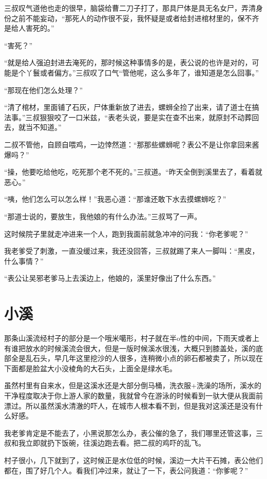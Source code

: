 三叔叹气道他也走的很早，脑袋给曹二刀子打了，那具尸体是具无名女尸，弄清身份之前不能妄动，“那死人的动作很不妥，我怀疑是或者给封进棺材里的，保不齐是给人害死的。”

“害死？”

“就是给人强迫封进去淹死的，那时候这种事情多的是，表公说的也许是对的，可能是个丫鬟或者偏方。”三叔叹了口气“管他呢，这么多年了，谁知道是怎么回事。”

“那现在他们怎么处理？”

“清了棺材，里面铺了石灰，尸体重新放了进去，螺蛳全捡了出来，请了道士在搞法事。”三叔狠狠咬了一口米兹，“表老头说，要是实在查不出来，就原封不动葬回去，就当不知道。”

二叔不管他，自顾自喂鸡，一边悻然道：“那那些螺蛳呢？表公不是让你拿回来酱爆吗？”

“操，他要吃给他吃，吃死那个老不死的。”三叔道。“昨天全倒到溪里去了，看着就恶心。”

“咦，他们怎么可以怎么样！”我恶心道：“那谁还敢下水去摸螺蛳吃？”

“那道士说的，要放生，我他娘的有什么办法。”三叔骂了一声。

这时候院子里就走冲进来一个人，跑到我面前就急冲冲的问我：“你老爹呢？”

我老爹受了刺激，一直没缓过来，我还没回答，三叔就踢了来人一脚叫：“黑皮，什么事情？”

“表公让吴邪老爹马上去溪边上，他娘的，溪里好像出了什么东西。”

\chapter{小溪}

那条山溪流经村子的部分是一个哦米噶形，村子就在半o性的中间，下雨天或者上有谁把放水的时候溪流会很大，但是一版时候溪水很浅，大概只到膝盖处，溪的底部全是乱石头，早几年这里挖沙的人很多，连稍微小点的卵石都被卖了，所以现在下面都是脸盆大小没棱角的大石头，上面全是绿水毛。

虽然村里有自来水，但是这溪水还是大部分倒马桶，洗衣服+洗澡的场所，溪水的干净程度取决于你上游人家的数量，我就曾今在游泳的时候看到一驮大便从我面前漂过。所以虽然溪水清澈的吓人，在城市人根本看不到，但是我对这溪还是没有什么好感。

我老爹肯定是不能去了，小黑说那怎么办，表公催的急了，我们哪里还管这事，三叔和我立即就扔下饭碗，往溪边跑去看。把二叔的鸡吓的乱飞。

村子很小，几下就到了，这时候正是水位低的时候，溪边一大片干石摊，表公他们都在，围了好几个人。看我们冲过来，就让了一下，表公问我道：“你爹呢？”


